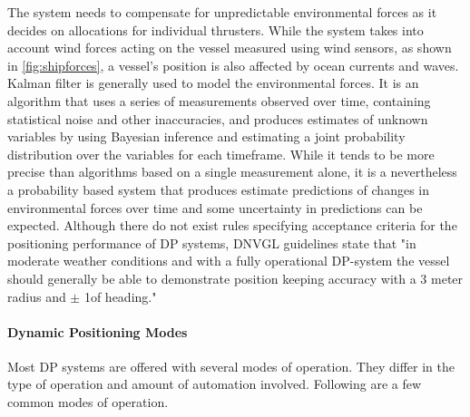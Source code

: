 The system needs to compensate for unpredictable environmental forces as it decides on allocations for individual thrusters. While the system takes into account wind forces acting on the vessel measured using wind sensors, as shown in \ref{fig:shipforces}, a vessel's position is also affected by ocean currents and waves. Kalman filter is generally used to model the environmental forces. It is an algorithm that uses a series of measurements observed over time, containing statistical noise and other inaccuracies, and produces estimates of unknown variables by using Bayesian inference and estimating a joint probability distribution over the variables for each timeframe. While it tends to be more precise than algorithms based on a single measurement alone, it is a nevertheless a probability based system that produces estimate predictions of changes in environmental forces over time and some uncertainty in predictions can be expected. Although there do not exist rules specifying acceptance criteria for the positioning performance of DP systems, DNVGL guidelines state that "in moderate weather conditions and with a fully operational DP-system the vessel should generally be able to demonstrate position keeping accuracy with a 3 meter radius and $ \pm $ 1\degree of heading." \parencite{veritas2011dynamic} 





\paragraph{Dynamic Positioning Modes}
Most DP systems are offered with several modes of operation. They differ in the type of operation and amount of automation involved. Following are a few common modes of operation. 


